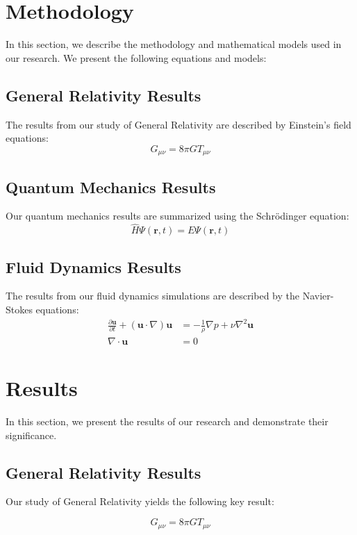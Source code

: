 \documentclass{article}
\begin{document}
\section{Methodology}
In this section, we describe the methodology and mathematical models used in our research. We present the following equations and models:

\subsection{General Relativity Results}
The results from our study of General Relativity are described by Einstein's field equations:
\begin{equation}
    G_{\mu\nu} = 8\pi GT_{\mu\nu}
\end{equation}

\subsection{Quantum Mechanics Results}
Our quantum mechanics results are summarized using the Schrödinger equation:
\begin{equation}
    \hat{H}\Psi(\mathbf{r}, t) = E\Psi(\mathbf{r}, t)
\end{equation}

\subsection{Fluid Dynamics Results}
The results from our fluid dynamics simulations are described by the Navier-Stokes equations:
\begin{align}
    \frac{\partial \mathbf{u}}{\partial t} + (\mathbf{u} \cdot \nabla)\mathbf{u} &= -\frac{1}{\rho}\nabla p + \nu\nabla^2\mathbf{u} \\
    \nabla \cdot \mathbf{u} &= 0
\end{align}

\section{Results}
In this section, we present the results of our research and demonstrate their significance. 

\subsection{General Relativity Results}
Our study of General Relativity yields the following key result:

\begin{equation}
    G_{\mu\nu} = 8\pi GT_{\mu\nu}
\end{equation}
\end{document}
